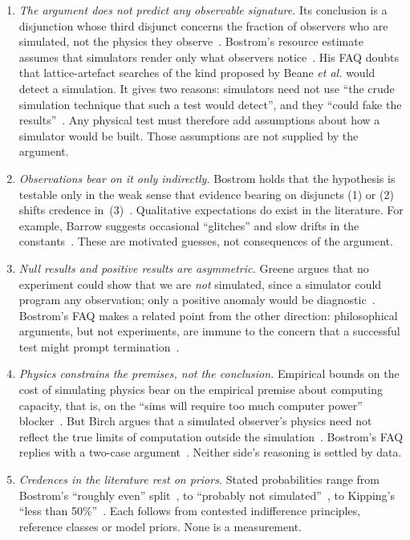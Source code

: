 \begin{enumerate}
\item \emph{The argument does not predict any observable signature.} Its conclusion is a
disjunction whose third disjunct concerns the fraction of observers who are simulated,
not the physics they observe~\cite{Bostrom2003are,Bostrom2005simulation}. Bostrom's
resource estimate assumes that simulators render only what observers
notice~\cite[\S\,III]{Bostrom2003are}. His FAQ doubts that lattice-artefact searches of the
kind proposed by Beane \emph{et al.} would detect a simulation. It gives two reasons:
simulators need not use ``the crude simulation technique that such a test would
detect'', and they ``could fake the results''~\cite[Q12]{Bostrom2025simulation}. Any physical test must therefore add
assumptions about how a simulator would be built. Those assumptions are not supplied by
the argument.

\item \emph{Observations bear on it only indirectly.} Bostrom holds that the hypothesis is
testable only in the weak sense that evidence bearing on disjuncts (1) or (2) shifts
credence in~(3)~\cite[Q11]{Bostrom2025simulation}. Qualitative expectations do exist in the
literature. For example, Barrow suggests occasional ``glitches'' and slow drifts in the
constants~\cite{Barrow2007living}. These are motivated guesses, not consequences of the
argument.

\item \emph{Null results and positive results are asymmetric.} Greene argues that no
experiment could show that we are \emph{not} simulated, since a simulator could program
any observation; only a positive anomaly would be diagnostic~\cite{Greene2020termination}.
Bostrom's FAQ makes a related point from the other direction: philosophical arguments, but
not experiments, are immune to the concern that a successful test might prompt
termination~\cite[Q12]{Bostrom2025simulation}.

\item \emph{Physics constrains the premises, not the conclusion.} Empirical bounds on the
cost of simulating physics bear on the empirical premise about computing capacity, that
is, on the ``sims will require too much computer power'' blocker~\cite{Chalmers2024precis}.
But Birch argues that a simulated observer's physics need not reflect the true limits of
computation outside the simulation~\cite{Birch2013on}. Bostrom's FAQ replies with a
two-case argument~\cite[Q4]{Bostrom2025simulation}. Neither side's reasoning is settled by
data.

\item \emph{Credences in the literature rest on priors.} Stated probabilities range from
Bostrom's ``roughly even'' split~\cite{Bostrom2003are}, to ``probably not
simulated''~\cite{Bostrom2009simulation}, to Kipping's ``less than
50\%''~\cite{Kipping2020bayesian}. Each follows from contested indifference principles,
reference classes or model priors. None is a measurement.
\end{enumerate}
